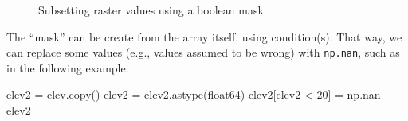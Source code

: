 \documentclass[
  letterpaper,
]{krantz}
\newenvironment{Shaded}{\begin{snugshade}}{\end{snugshade}}
\newcommand{\DecValTok}[1]{\textcolor[rgb]{0.68,0.00,0.00}{#1}}
\newcommand{\NormalTok}[1]{\textcolor[rgb]{0.00,0.23,0.31}{#1}}
\newcommand{\OperatorTok}[1]{\textcolor[rgb]{0.37,0.37,0.37}{#1}}
\newcommand{\StringTok}[1]{\textcolor[rgb]{0.13,0.47,0.30}{#1}}
\begin{document}
\begin{figure}

\begin{minipage}{0.33\linewidth}



\end{minipage}%
%
\begin{minipage}{0.33\linewidth}



\end{minipage}%
%
\begin{minipage}{0.33\linewidth}



\end{minipage}%

\caption{\label{fig-raster-subset}Subsetting raster values using a
boolean mask}

\end{figure}%

The ``mask'' can be create from the array itself, using condition(s).
That way, we can replace some values (e.g., values assumed to be wrong)
with \texttt{np.nan}, such as in the following example.

\begin{Shaded}
\begin{Highlighting}[]
\NormalTok{elev2 }\OperatorTok{=}\NormalTok{ elev.copy()}
\NormalTok{elev2 }\OperatorTok{=}\NormalTok{ elev2.astype(}\StringTok{\textquotesingle{}float64\textquotesingle{}}\NormalTok{)}
\NormalTok{elev2[elev2 }\OperatorTok{\textless{}} \DecValTok{20}\NormalTok{] }\OperatorTok{=}\NormalTok{ np.nan}
\NormalTok{elev2}
\end{Highlighting}
\end{Shaded}
\end{document}
